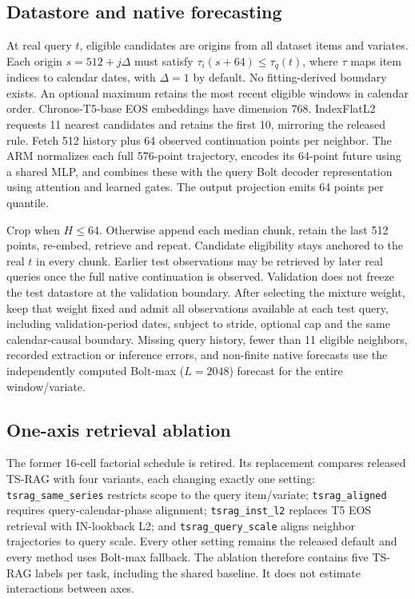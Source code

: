 \documentclass[11pt,a4paper]{article}
\begin{document}
\subsection{Datastore and native forecasting}
At real query $t$, eligible candidates are origins from all dataset items and variates.
Each origin $s=512+j\Delta$ must satisfy $\tau_i(s+64)\le\tau_q(t)$,
where $\tau$ maps item indices to calendar dates, with $\Delta=1$ by default. No
fitting-derived boundary exists. An optional maximum retains the most recent
eligible windows in calendar order. Chronos-T5-base EOS embeddings have dimension 768.
IndexFlatL2 requests 11 nearest candidates and retains the first 10,
mirroring the released rule. Fetch 512 history plus 64 observed continuation
points per neighbor. The ARM normalizes each full 576-point trajectory,
encodes its 64-point future using a shared MLP, and combines these with the
query Bolt decoder representation using attention and learned gates.
The output projection emits 64 points per quantile.

Crop when $H\le64$. Otherwise append each median chunk, retain the last 512
points, re-embed, retrieve and repeat. Candidate eligibility stays anchored
to the real $t$ in every chunk. Earlier test observations may be retrieved
by later real queries once the full native continuation is observed.
Validation does not freeze the test datastore at the validation boundary.
After selecting the mixture weight, keep that weight fixed and admit all
observations available at each test query, including validation-period dates,
subject to stride, optional cap and the same calendar-causal boundary.
Missing query history, fewer than 11 eligible neighbors, recorded extraction
or inference errors, and non-finite native forecasts use
the independently computed Bolt-max ($L=2048$) forecast for the entire window/variate.

\subsection{One-axis retrieval ablation}
The former 16-cell factorial schedule is retired. Its replacement compares
released TS-RAG with four variants, each changing exactly one setting:
\texttt{tsrag\_same\_series} restricts scope to the query item/variate;
\texttt{tsrag\_aligned} requires query-calendar-phase alignment;
\texttt{tsrag\_inst\_l2} replaces T5 EOS retrieval with IN-lookback L2; and
\texttt{tsrag\_query\_scale} aligns neighbor trajectories to query scale.
Every other setting remains the released default and every method uses Bolt-max
fallback. The ablation therefore contains five TS-RAG labels per task, including
the shared baseline. It does not estimate interactions between axes.
\end{document}
